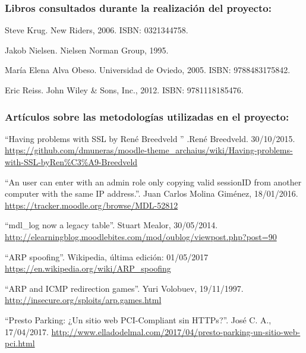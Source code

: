 



\subsubsection*{Libros consultados durante la realización del proyecto:}


Steve Krug.
\newblock New Riders, 2006.
\newblock ISBN: 0321344758.

Jakob Nielsen.
\newblock Nielsen Norman Group, 1995.

María Elena Alva Obeso.
\newblock Universidad de Oviedo, 2005.
\newblock ISBN: 9788483175842.

Eric Reiss.
\newblock John Wiley \& Sons, Inc., 2012.
\newblock ISBN: 9781118185476.


\subsubsection*{Artículos sobre las metodologías utilizadas en el proyecto:}


 ``Having problems with SSL by René Breedveld
'' .René Breedveld. 30/10/2015. \url{https://github.com/dmuneras/moodle-theme_archaius/wiki/Having-problems-with-SSL-byRen\%C3\%A9-Breedveld}

 ``An user can enter with an admin role only copying valid sessionID from another computer with the same IP address.''. Juan Carlos Molina Giménez, 18/01/2016. \url{https://tracker.moodle.org/browse/MDL-52812}

 ``mdl\_log now a legacy table''. Stuart Mealor, 30/05/2014. \url{http://elearningblog.moodlebites.com/mod/oublog/viewpost.php?post=90}

 ``ARP spoofing''. Wikipedia, última edición: 01/05/2017 \url{https://en.wikipedia.org/wiki/ARP_spoofing}

 ``ARP and ICMP redirection games''. Yuri Volobuev, 19/11/1997. \url{http://insecure.org/sploits/arp.games.html}

 ``Presto Parking: ¿Un sitio web PCI-Compliant sin HTTPs?''. José C. A., 17/04/2017. \url{http://www.elladodelmal.com/2017/04/presto-parking-un-sitio-web-pci.html}

